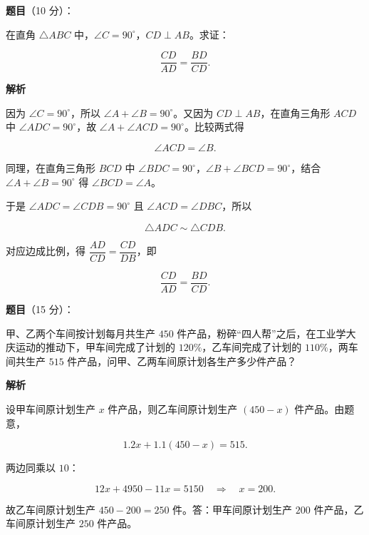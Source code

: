 \begin{answer}

\textbf{题目}（10 分）：

在直角 $\triangle ABC$ 中，$\angle C=90^\circ$，$CD\perp AB$。求证：

\nopagebreak[4]
\[
\frac{CD}{AD}=\frac{BD}{CD}.
\]
\nopagebreak[4]
\begin{center}\end{center}
\nopagebreak[4]
\textbf{解析}

因为 $\angle C=90^\circ$，所以 $\angle A+\angle B=90^\circ$。又因为 $CD\perp AB$，在直角三角形 $ACD$ 中 $\angle ADC=90^\circ$，故 $\angle A+\angle ACD=90^\circ$。比较两式得

\nopagebreak[4]
\[
\angle ACD=\angle B.
\]

同理，在直角三角形 $BCD$ 中 $\angle BDC=90^\circ$，$\angle B+\angle BCD=90^\circ$，结合 $\angle A+\angle B=90^\circ$ 得 $\angle BCD=\angle A$。

于是 $\angle ADC=\angle CDB=90^\circ$ 且 $\angle ACD=\angle DBC$，所以

\nopagebreak[4]
\[
\triangle ADC\sim\triangle CDB.
\]

对应边成比例，得 $\dfrac{AD}{CD}=\dfrac{CD}{DB}$，即

\nopagebreak[4]
\[
\frac{CD}{AD}=\frac{BD}{CD}.
\]


\end{answer}
\begin{answer}

\textbf{题目}（15 分）：

甲、乙两个车间按计划每月共生产 $450$ 件产品，粉碎“四人帮”之后，在工业学大庆运动的推动下，甲车间完成了计划的 $120\%$，乙车间完成了计划的 $110\%$，两车间共生产 $515$ 件产品，问甲、乙两车间原计划各生产多少件产品？

\textbf{解析}

设甲车间原计划生产 $x$ 件产品，则乙车间原计划生产 $(450-x)$ 件产品。由题意，

\nopagebreak[4]
\[
1.2x+1.1(450-x)=515.
\]

两边同乘以 $10$：

\nopagebreak[4]
\[
12x+4950-11x=5150
\quad\Longrightarrow\quad
x=200.
\]

故乙车间原计划生产 $450-200=250$ 件。答：甲车间原计划生产 $200$ 件产品，乙车间原计划生产 $250$ 件产品。


\end{answer}
